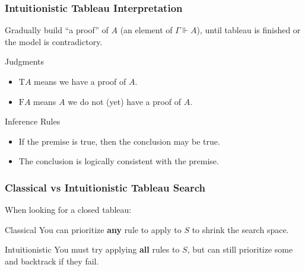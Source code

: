 \documentclass[mathserif]{beamer}
\def\T{\textrm{T}}
\def\F{\textrm{F}}
\newcommand{\diff}[1]{{\color{red} #1}}
\newcommand{\force}[1]{\Gamma \Vdash #1}
\begin{document}
\begin{frame}
\frametitle{Intuitionistic Tableau Interpretation}

Gradually build ``a proof'' of $A$ (an element of $\force{A}$),
until tableau is finished or the model is contradictory.

\begin{block}{Judgments}
\begin{itemize}
\item $\T A$ means we have a proof of $A$.
\item $\F A$ means $A$ we do not (yet) have a proof of $A$.
\end{itemize}
\end{block}

\begin{block}{Inference Rules}
\begin{itemize}
\item If the premise is true, then the conclusion \diff{may} be true.
\item The conclusion is logically consistent with the premise.
\end{itemize}
\end{block}

\end{frame}


\begin{frame}
\frametitle{Classical vs Intuitionistic Tableau Search}

When looking for a closed tableau:

\begin{block}{Classical}
You can prioritize {\bf any} rule to apply to $S$ to shrink the search space.
\end{block}

\begin{block}{Intuitionistic}
You must try applying {\bf all} rules to $S$,
but can still prioritize some and backtrack if they fail.
\end{block}

\end{frame}
\end{document}
